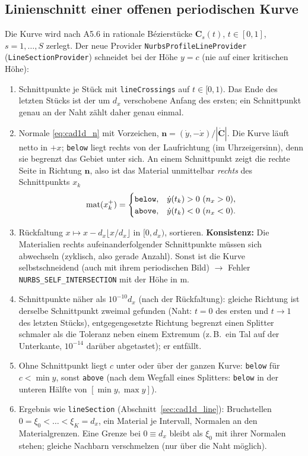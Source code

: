 \subsection{Linienschnitt einer offenen periodischen Kurve}\label{sec:nurbs1d_line}
Die Kurve wird nach A5.6 in rationale Bézierstücke $\mathbf C_s(t)$, $t\in[0,1]$, $s=1,\dots,S$ zerlegt. Der neue
Provider \verb|NurbsProfileLineProvider| (\verb|LineSectionProvider|) schneidet bei der Höhe $y=c$ (nie auf einer
kritischen Höhe):
\begin{enumerate}[nosep]
  \item Schnittpunkte je Stück mit \verb|lineCrossings| auf $t\in[0,1)$. Das Ende des letzten Stücks ist der um $d_x$
        verschobene Anfang des ersten; ein Schnittpunkt genau an der Naht zählt daher genau einmal.
  \item Normale \eqref{eq:cad1d_n} mit Vorzeichen, $\mathbf n=(\dot y,-\dot x)/|\dot{\mathbf C}|$. Die Kurve läuft
        netto in $+x$; \verb|below| liegt rechts von der Laufrichtung (im Uhrzeigersinn), denn sie begrenzt das
        Gebiet unter sich. An einem Schnittpunkt zeigt die rechte Seite in Richtung $\mathbf n$, also ist das Material
        unmittelbar \emph{rechts} des Schnittpunkts $x_k$
        \begin{equation}
          \text{mat}(x_k^+)=\begin{cases}\verb|below|, & \dot y(t_k)>0\ (n_x>0),\\ \verb|above|, & \dot y(t_k)<0\ (n_x<0).\end{cases}
          \label{eq:nurbs1d_rule}
        \end{equation}
  \item Rückfaltung $x\mapsto x-d_x\lfloor x/d_x\rfloor$ in $[0,d_x)$, sortieren. \textbf{Konsistenz:} Die Materialien
        rechts aufeinanderfolgender Schnittpunkte müssen sich abwechseln (zyklisch, also gerade Anzahl). Sonst ist die
        Kurve selbstschneidend (auch mit ihrem periodischen Bild) $\to$ Fehler \verb|NURBS_SELF_INTERSECTION|
        mit der Höhe in \textmu m.
  \item Schnittpunkte näher als $10^{-10}d_x$ (nach der Rückfaltung): gleiche Richtung ist derselbe Schnittpunkt
        zweimal gefunden (Naht: $t=0$ des ersten und $t\to1$ des letzten Stücks), entgegengesetzte Richtung begrenzt
        einen Splitter schmaler als die Toleranz neben einem Extremum (z.\,B.\ ein Tal auf der Unterkante, $10^{-14}$
        darüber abgetastet); er entfällt.
  \item Ohne Schnittpunkt liegt $c$ unter oder über der ganzen Kurve: \verb|below| für $c<\min y$, sonst \verb|above|
        (nach dem Wegfall eines Splitters: \verb|below| in der unteren Hälfte von $[\min y,\max y]$).
  \item Ergebnis wie \verb|lineSection| (Abschnitt~\ref{sec:cad1d_line}): Bruchstellen $0=\xi_0<\dots<\xi_K=d_x$, ein
        Material je Intervall, Normalen an den Materialgrenzen. Eine Grenze bei $0\equiv d_x$ bleibt als
        $\xi_0$ mit ihrer Normalen stehen; gleiche Nachbarn verschmelzen (nur über die Naht möglich).
\end{enumerate}
